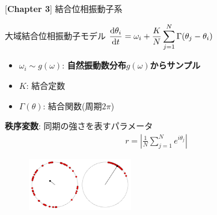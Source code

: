 \begin{frame}{[\textbf{Chapter 3}] 結合位相振動子系}
  \begin{block}{大域結合位相振動子モデル}
  \centering
  $\displaystyle\frac{\mathrm{d}\theta_{i}}{\mathrm{d} t}=\omega_{i}+\frac{K}{N}\sum_{j=1}^{N}\Gamma(\theta_{j}-\theta_{i})$
  \begin{itemize}
    \item $\omega_{i}\sim g(\omega)$: \textbf{自然振動数分布$g(\omega)$からサンプル}
    \item $K$: 結合定数
    \item $\Gamma(\theta)$: 結合関数(周期$2\pi$)
  \end{itemize}
  \end{block}
  \checkmark \textbf{秩序変数}: 同期の強さを表すパラメータ
  \begin{align*}
    r=\left|\frac{1}{N}\sum_{j=1}^{N}e^{i\theta_{j}}\right|
  \end{align*}
  \begin{figure}
    \centering
    \includegraphics[width=0.4\textwidth]{figs/sync_notsync.pdf}
  \end{figure}
\end{frame}

